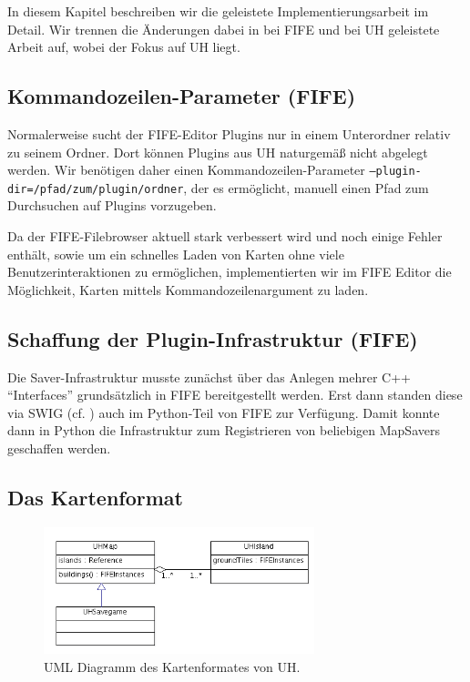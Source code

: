 In diesem Kapitel beschreiben wir die geleistete Implementierungsarbeit im
Detail. Wir trennen die Änderungen dabei in bei FIFE und bei UH geleistete
Arbeit auf, wobei der Fokus auf UH liegt. 


\subsection{Kommandozeilen-Parameter (FIFE)}
Normalerweise sucht der FIFE-Editor Plugins nur in einem Unterordner relativ zu
seinem Ordner. Dort können Plugins aus UH naturgemäß nicht abgelegt werden. Wir
benötigen daher einen Kommandozeilen-Parameter {\tt --plugin-dir=/pfad/zum/plugin/ordner},
der es ermöglicht, manuell einen Pfad zum Durchsuchen auf Plugins vorzugeben. 

Da der FIFE-Filebrowser aktuell stark verbessert wird und noch einige Fehler enthält, sowie
um ein schnelles Laden von Karten
ohne viele Benutzerinteraktionen zu ermöglichen, implementierten wir im FIFE
Editor die Möglichkeit, Karten mittels Kommandozeilenargument zu laden. 



\subsection{Schaffung der Plugin-Infrastruktur (FIFE)}
Die Saver-Infrastruktur musste zunächst über das Anlegen mehrer C++
``Interfaces'' grundsätzlich in FIFE bereitgestellt werden. Erst dann standen
diese via SWIG (cf.
\cite{swig}) auch im Python-Teil von FIFE zur Verfügung. Damit konnte dann in
Python die Infrastruktur zum Registrieren von beliebigen MapSavers geschaffen
werden.

\subsection{Das Kartenformat}
\label{kartenformat}

%
%
\begin{figure}[htbp]
  \centering

    \includegraphics[width=0.7\textwidth]{gfx/klassendiagramm-UHSaveGame.png}

  \caption{UML Diagramm des Kartenformates von UH.}
  \label{figure:automaton-intersection}
\end{figure}

